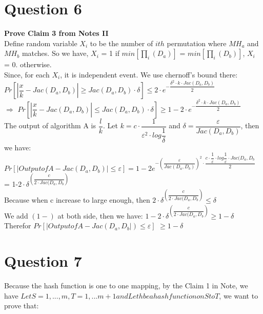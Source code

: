 \documentclass{article}
\begin{document}
\clearpage
\section{Question 6}
\textbf{Prove Claim 3 from Notes II}\\

Define random variable $X_{i}$ to be the number of $ith$ permutation where   $MH_{a}$ and $MH_{b}$ matches. So we have, $X_{i}$ = 1 if $min[\prod_{i}(D_{a})]$ = $min[\prod_{i}(D_{b})]$, $X_{i}$ = 0. otherwise.\\

Since, for each $X_{i}$, it is independent event. We use chernoff's bound there:\\

$Pr[|\dfrac{x}{k} - Jac(D_{a}, D_{b})| \geq Jac(D_{a}, D_{b}) \cdot \delta] \leq 2 \cdot e^{-\dfrac{\delta^{2} \cdot k \cdot Jac(D_{a}, D_{b})}{2}}$ \\

$\Longrightarrow$ $Pr[|\dfrac{x}{k} - Jac(D_{a}, D_{b})| \leq Jac(D_{a}, D_{b}) \cdot \delta] \geq 1 - 2 \cdot e^{-\dfrac{\delta^{2} \cdot k \cdot Jac(D_{a}, D_{b})}{2}}$\\

The output of algorithm A is $\dfrac{l}{k}$. Let $k = c \cdot \dfrac{1}{\varepsilon^{2} \cdot log\dfrac{1}{\delta}}$  and $\delta = \dfrac{\varepsilon}{Jac(D_{a}, D_{b})}$, then we have:\\

$Pr[|Output of A - Jac(D_{a}, D_{b})| \leq \varepsilon] = 1 - 2e^{- (\dfrac{\varepsilon}{Jac(D_{a}, D_{b})})^{2} \cdot \dfrac{c \cdot \dfrac{1}{\varepsilon} \cdot log\dfrac{1}{\varepsilon} \cdot Jac(D_{a}, D_{b}}{2}}$  = 1-$2  \cdot \delta^{(\dfrac{c}{2 \cdot Jac(D_{a}, D_{b}})}$\\

Because when c increase to large enough, then $2 \cdot \delta^{(\dfrac{c}{2 \cdot Jac(D_{a}, D_{b}})} \leq \delta$\\

We add $(1 - )$ at both side, then we have: $1 - 2 \cdot \delta^{(\dfrac{c}{2 \cdot Jac(D_{a}, D_{b}})} \geq 1- \delta$\\

Therefor $Pr[|Output of A - Jac(D_{a}, D_{b}|) \leq \varepsilon]$ $\geq 1- \delta$

\clearpage

\section{Question 7}
Because the hash function is one to one mapping, by the Claim 1 in Note, we have $Let S = {1,..., m}, T = {1,...m+1} and Let h be a hash function on S to T$, we want to prove that:\\
\end{document}

